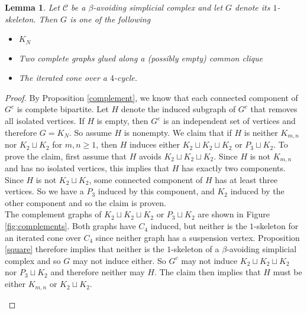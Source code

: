 \documentclass[letterpaper,12pt]{amsart}
\theoremstyle{plain}
\newtheorem{lemma}[thm]{Lemma}
\theoremstyle{definition}
\theoremstyle{remark}
\newcommand{\vertex}{\node[vertex]}
\begin{document}
\begin{lemma}\label{1skel}
	Let $\mathcal{C}$ be a $\beta$-avoiding simplicial complex and let $G$ denote its $1$-skeleton.
	Then $G$ is one of the following
	\begin{itemize}
		\item[(a)] $K_N$
		\item[(b)] Two complete graphs glued along a (possibly empty) common clique
		\item[(c)] The iterated cone over a $4$-cycle.
	\end{itemize}
\end{lemma}
\begin{proof}
	By Proposition \ref{complement}, we know that each connected component of $G^c$ is complete bipartite.
	Let $H$ denote the induced subgraph of $G^c$ that removes all isolated vertices.
	If $H$ is empty, then $G^c$ is an independent set of vertices and therefore $G = K_N$.
	So assume $H$ is nonempty.
	We claim that if $H$ is neither $K_{m,n}$ nor $K_2 \sqcup K_2$ for $m,n \ge 1$,
	then $H$ induces either $K_2 \sqcup K_2 \sqcup K_2$ or $P_3 \sqcup K_2$.
	To prove the claim, first assume that $H$ avoids $K_2 \sqcup K_2 \sqcup K_2$.
	Since $H$ is not $K_{m,n}$ and has no isolated vertices, this implies that $H$ has exactly two components.
	Since $H$ is not $K_2 \sqcup K_2$, some connected component of $H$ has at least three vertices.
	So we have a $P_3$ induced by this component, and $K_2$ induced by the other component and so the claim is proven.
	\\
	\indent
	The complement graphs of $K_2 \sqcup K_2 \sqcup K_2$ or $P_3 \sqcup K_2$
	are shown in Figure \ref{fig:complements}.
	Both graphs have $C_4$ induced, but neither is the $1$-skeleton
	for an iterated cone over $C_4$ since neither graph has a suspension vertex.
	Proposition \ref{square} therefore implies that neither is the $1$-skeleton of a $\beta$-avoiding simplicial complex
	and so $G$ may not induce either.
	So $G^c$ may not induce $K_2 \sqcup K_2 \sqcup K_2$ nor $P_3 \sqcup K_2$ and therefore neither may $H$.
	The claim then implies that $H$ must be either $K_{m,n}$ or $K_2 \sqcup K_2$.
	\begin{figure}
\end{figure}
\end{proof}
\end{document}
